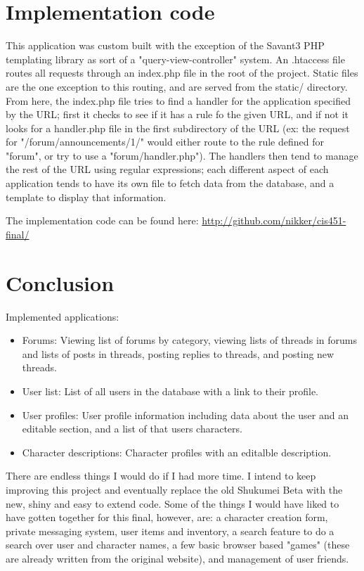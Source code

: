 \documentclass{book}
\begin{document}
\section{Implementation code}
This application was custom built with the exception of the Savant3 PHP templating library as sort of a "query-view-controller" system.  An .htaccess file routes all requests through an index.php file in the root of the project.  Static files are the one exception to this routing, and are served from the static/ directory.  From here, the index.php file tries to find a handler for the application specified by the URL; first it checks to see if it has a rule fo the given URL, and if not it looks for a handler.php file in the first subdirectory of the URL (ex: the request for "/forum/announcements/1/" would either route to the rule defined for "forum", or try to use a "forum/handler.php").  The handlers then tend to manage the rest of the URL using regular expressions; each different aspect of each application tends to have its own file to fetch data from the database, and a template to display that information.

The implementation code can be found here: \url{http://github.com/nikker/cis451-final/}

\newpage
\section{Conclusion}
Implemented applications:
\begin{itemize}
	\item Forums: Viewing list of forums by category, viewing lists of threads in forums and lists of posts in threads, posting replies to threads, and posting new threads.
	\item User list: List of all users in the database with a link to their profile.
	\item User profiles: User profile information including data about the user and an editable section, and a list of that users characters.
	\item Character descriptions:  Character profiles with an editalble description.
\end{itemize}

There are endless things I would do if I had more time.  I intend to keep improving this project and eventually replace the old Shukumei Beta with the new, shiny and easy to extend code.
Some of the things I would have liked to have gotten together for this final, however, are: a character creation form, private messaging system, user items and inventory, a search feature to do a search over user and character names, a few basic browser based "games" (these are already written from the original website), and management of user friends.
\end{document}
